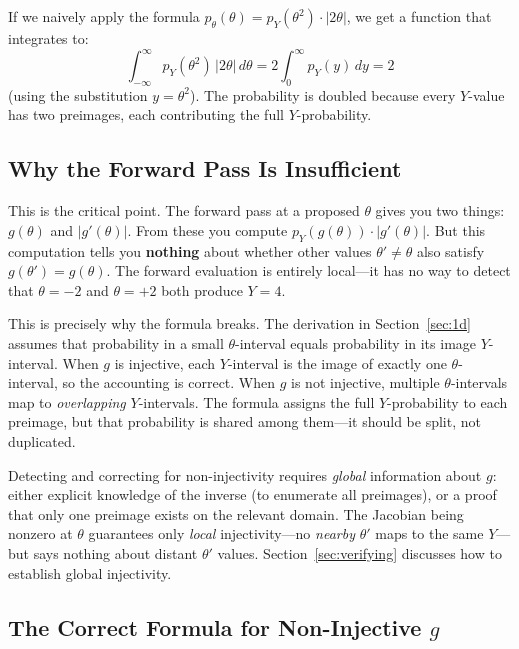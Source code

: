 \documentclass[11pt,a4paper]{article}
\theoremstyle{definition}
\begin{document}
If we naively apply the formula $p_\theta(\theta) = p_Y(\theta^2) \cdot
|2\theta|$, we get a function that integrates to:
\begin{equation}
    \int_{-\infty}^{\infty} p_Y(\theta^2) \, |2\theta| \, d\theta
    = 2 \int_0^{\infty} p_Y(y) \, dy = 2
\end{equation}
(using the substitution $y = \theta^2$). The probability is doubled because
every $Y$-value has two preimages, each contributing the full
$Y$-probability.

\subsection{Why the Forward Pass Is Insufficient}

This is the critical point. The forward pass at a proposed $\theta$ gives you
two things: $g(\theta)$ and $|g'(\theta)|$. From these you compute
$p_Y(g(\theta)) \cdot |g'(\theta)|$. But this computation tells you
\textbf{nothing} about whether other values $\theta' \neq \theta$ also satisfy
$g(\theta') = g(\theta)$. The forward evaluation is entirely local---it has no
way to detect that $\theta = -2$ and $\theta = +2$ both produce $Y = 4$.

This is precisely why the formula breaks. The derivation in
Section~\ref{sec:1d} assumes that probability in a small $\theta$-interval
equals probability in its image $Y$-interval. When $g$ is injective, each
$Y$-interval is the image of exactly one $\theta$-interval, so the accounting
is correct. When $g$ is not injective, multiple $\theta$-intervals map to
\emph{overlapping} $Y$-intervals. The formula assigns the full
$Y$-probability to each preimage, but that probability is shared among them---it
should be split, not duplicated.

Detecting and correcting for non-injectivity requires \emph{global} information
about $g$: either explicit knowledge of the inverse (to enumerate all
preimages), or a proof that only one preimage exists on the relevant domain.
The Jacobian being nonzero at $\theta$ guarantees only \emph{local}
injectivity---no \emph{nearby} $\theta'$ maps to the same $Y$---but says
nothing about distant $\theta'$ values. Section~\ref{sec:verifying} discusses
how to establish global injectivity.

\subsection{The Correct Formula for Non-Injective \texorpdfstring{$g$}{g}}
\end{document}
